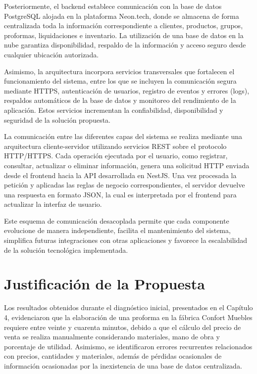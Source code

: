 Posteriormente, el backend establece comunicación con la base de datos PostgreSQL alojada en la plataforma Neon.tech, donde se almacena de forma centralizada toda la información correspondiente a clientes, productos, grupos, proformas, liquidaciones e inventario. La utilización de una base de datos en la nube garantiza disponibilidad, respaldo de la información y acceso seguro desde cualquier ubicación autorizada.

Asimismo, la arquitectura incorpora servicios transversales que fortalecen el funcionamiento del sistema, entre los que se incluyen la comunicación segura mediante HTTPS, autenticación de usuarios, registro de eventos y errores (logs), respaldos automáticos de la base de datos y monitoreo del rendimiento de la aplicación. Estos servicios incrementan la confiabilidad, disponibilidad y seguridad de la solución propuesta.

La comunicación entre las diferentes capas del sistema se realiza mediante una arquitectura cliente-servidor utilizando servicios REST sobre el protocolo HTTP/HTTPS. Cada operación ejecutada por el usuario, como registrar, consultar, actualizar o eliminar información, genera una solicitud HTTP enviada desde el frontend hacia la API desarrollada en NestJS. Una vez procesada la petición y aplicadas las reglas de negocio correspondientes, el servidor devuelve una respuesta en formato JSON, la cual es interpretada por el frontend para actualizar la interfaz de usuario.

Este esquema de comunicación desacoplada permite que cada componente evolucione de manera independiente, facilita el mantenimiento del sistema, simplifica futuras integraciones con otras aplicaciones y favorece la escalabilidad de la solución tecnológica implementada.

\section{Justificación de la Propuesta}

Los resultados obtenidos durante el diagnóstico inicial, presentados en el Capítulo 4, evidenciaron que la elaboración de una proforma en la fábrica Confort Muebles requiere entre veinte y cuarenta minutos, debido a que el cálculo del precio de venta se realiza manualmente considerando materiales, mano de obra y porcentaje de utilidad. Asimismo, se identificaron errores recurrentes relacionados con precios, cantidades y materiales, además de pérdidas ocasionales de información ocasionadas por la inexistencia de una base de datos centralizada.

